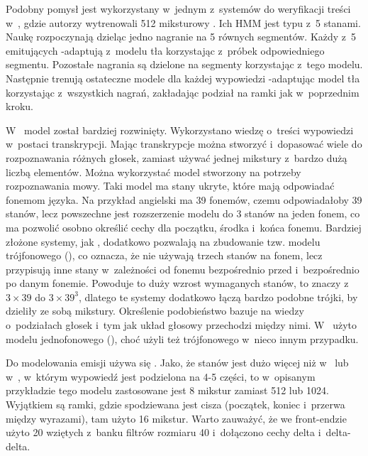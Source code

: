 Podobny pomysł jest wykorzystany w~jednym z~systemów do weryfikacji treści w~\cite{utteranceVerificationFor}, gdzie
autorzy wytrenowali 512 miksturowy . Ich HMM jest typu  z~5 stanami.
Naukę rozpoczynają dzieląc jedno nagranie na 5 równych segmentów.
Każdy z~5  emitujących -adaptują z~modelu tła korzystając z~próbek odpowiedniego segmentu.
Pozostałe nagrania są dzielone na segmenty korzystając z~tego modelu. Następnie trenują ostateczne modele dla każdej
wypowiedzi -adaptując model tła korzystając z~wszystkich nagrań, zakładając podział na ramki jak
w~poprzednim kroku.

W~\cite{comparisonOfMultiple}
model  został bardziej rozwinięty. Wykorzystano wiedzę o~treści wypowiedzi w~postaci transkrypcji.
Mając transkrypcje można stworzyć i~dopasować wiele  do rozpoznawania różnych głosek, zamiast
używać jednej mikstury z~bardzo dużą liczbą elementów. Można wykorzystać model stworzony na potrzeby rozpoznawania mowy.
Taki model ma stany ukryte, które mają odpowiadać fonemom języka. Na przykład angielski ma 39
fonemów, czemu odpowiadałoby 39 stanów, lecz powszechne jest rozszerzenie
modelu do 3 stanów na jeden fonem, co ma pozwolić osobno określić cechy dla początku, środka i~końca fonemu.
Bardziej złożone systemy, jak \cite{theHtkBook}
, dodatkowo pozwalają na zbudowanie tzw. modelu trójfonowego (), co oznacza,
że nie używają trzech stanów na fonem, lecz
przypisują inne stany w~zależności od fonemu bezpośrednio przed i~bezpośrednio po danym fonemie.
Powoduje to duży wzrost wymaganych stanów, to znaczy z~$3 \times 39$ do $3 \times 39^3$,
dlatego te systemy dodatkowo łączą bardzo podobne trójki, by dzieliły ze sobą mikstury.
Określenie podobieństwo bazuje na wiedzy o~podziałach głosek i~tym jak układ głosowy przechodzi między nimi.
W~\cite{comparisonOfMultiple}
użyto modelu jednofonowego (), choć użyli też trójfonowego w~nieco innym przypadku.

Do modelowania emisji używa się . Jako, że stanów jest dużo więcej niż w~
lub w~, w~którym wypowiedź jest podzielona na 4-5 części, to
w~opisanym przykładzie tego modelu zastosowane jest 8 mikstur zamiast 512 lub 1024. Wyjątkiem są ramki,
gdzie spodziewana jest cisza (początek, koniec i~przerwa między wyrazami), tam
użyto 16 mikstur. Warto zauważyć, że we front-endzie użyto 20  wziętych z~banku filtrów rozmiaru
40 i~dołączono cechy delta i~delta-delta.

